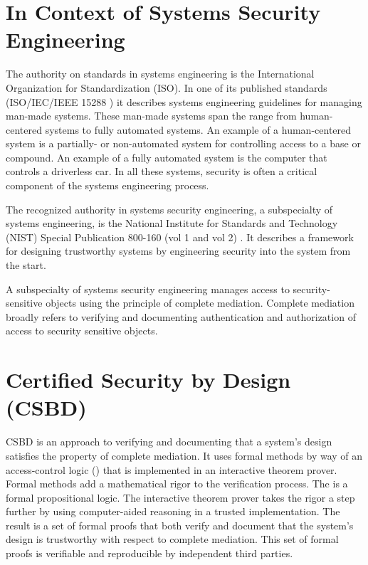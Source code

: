 \documentclass[../../main/main.tex]{subfiles}
\begin{document}
\section{In Context of Systems Security Engineering}\label{sec:intro:motivation}
The authority on standards in systems engineering is the International Organization for Standardization (ISO).  In one of its published standards (ISO/IEC/IEEE 15288 \cite{iso15288}) it describes systems engineering guidelines for managing man-made systems.  These man-made systems span the range from human-centered systems to fully automated systems.  An example of a human-centered system is a partially- or non-automated system for controlling access to a base or compound.  An example of a fully automated system is the computer that controls a driverless car.  In all these systems, security is often a critical component of the systems engineering process.


The recognized authority in systems security engineering, a subspecialty of systems engineering, is the National Institute for Standards and Technology (NIST) Special Publication 800-160 (vol 1 and vol 2) \cite{NIST800160}.  It describes a framework for designing trustworthy systems by engineering security into the system from the start.  

A subspecialty of systems security engineering manages access to security-sensitive objects using the principle of complete mediation.  Complete mediation broadly refers to verifying and documenting authentication and authorization of access to security sensitive objects. 


\section{Certified Security by Design (CSBD)}\label{sec:intro:motivation}
CSBD is an approach to verifying and documenting that a system's design satisfies the property of complete mediation. It uses formal methods by way of an access-control logic () that is implemented in an interactive theorem prover.  Formal methods add a mathematical rigor to the verification process.  The  is a formal propositional logic.  The interactive theorem prover takes the rigor a step further by using computer-aided reasoning in a trusted implementation.   The result is a set of formal proofs that both verify and document that the system's design is trustworthy with respect to complete mediation.  This set of formal proofs is verifiable and reproducible by independent third parties. 
\end{document}
